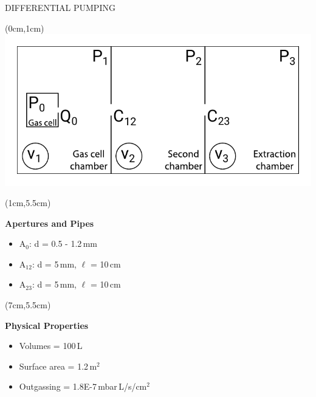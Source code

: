\documentclass[9pt]{beamer}
\begin{document}
\begin{frame}{DIFFERENTIAL PUMPING}
    \begin{textblock*}{13cm}(0cm,1cm)
            \centering
            \includegraphics[scale=0.7]{assets/simpdiffsect.pdf}
    \end{textblock*}
    
    \begin{textblock*}{5cm}(1cm,5.5cm)
      \centering
      {\textbf{Apertures and Pipes}
      \begin{itemize}
          \item A$_0$: d = 0.5 - 1.2\,mm
          \item A$_{12}$: d = 5\,mm, $\ell$ = 10\,cm
          \item A$_{23}$: d = 5\,mm, $\ell$ = 10\,cm
      \end{itemize}}
    \end{textblock*}
    
    \begin{textblock*}{5cm}(7cm,5.5cm)
      \centering
      {\textbf{Physical Properties}
        \begin{itemize}
          \item Volumes = 100\,L
          \item Surface area = 1.2\,m$^2$
          \item Outgassing = 1.8E-7\,mbar\,L/s/cm$^2$
        \end{itemize}}
    \end{textblock*}
    \end{frame}
    
\end{document}

